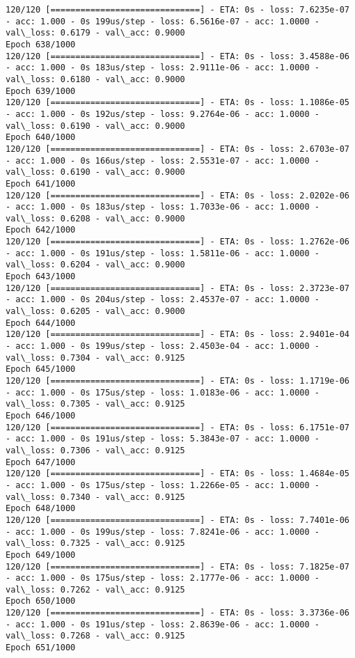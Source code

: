 \documentclass[11pt]{article}
\begin{document}
\begin{Verbatim}[commandchars=\\\{\}]
120/120 [==============================] - ETA: 0s - loss: 7.6235e-07 - acc: 1.000 - 0s 199us/step - loss: 6.5616e-07 - acc: 1.0000 - val\_loss: 0.6179 - val\_acc: 0.9000
Epoch 638/1000
120/120 [==============================] - ETA: 0s - loss: 3.4588e-06 - acc: 1.000 - 0s 183us/step - loss: 2.9111e-06 - acc: 1.0000 - val\_loss: 0.6180 - val\_acc: 0.9000
Epoch 639/1000
120/120 [==============================] - ETA: 0s - loss: 1.1086e-05 - acc: 1.000 - 0s 192us/step - loss: 9.2764e-06 - acc: 1.0000 - val\_loss: 0.6190 - val\_acc: 0.9000
Epoch 640/1000
120/120 [==============================] - ETA: 0s - loss: 2.6703e-07 - acc: 1.000 - 0s 166us/step - loss: 2.5531e-07 - acc: 1.0000 - val\_loss: 0.6190 - val\_acc: 0.9000
Epoch 641/1000
120/120 [==============================] - ETA: 0s - loss: 2.0202e-06 - acc: 1.000 - 0s 183us/step - loss: 1.7033e-06 - acc: 1.0000 - val\_loss: 0.6208 - val\_acc: 0.9000
Epoch 642/1000
120/120 [==============================] - ETA: 0s - loss: 1.2762e-06 - acc: 1.000 - 0s 191us/step - loss: 1.5811e-06 - acc: 1.0000 - val\_loss: 0.6204 - val\_acc: 0.9000
Epoch 643/1000
120/120 [==============================] - ETA: 0s - loss: 2.3723e-07 - acc: 1.000 - 0s 204us/step - loss: 2.4537e-07 - acc: 1.0000 - val\_loss: 0.6205 - val\_acc: 0.9000
Epoch 644/1000
120/120 [==============================] - ETA: 0s - loss: 2.9401e-04 - acc: 1.000 - 0s 199us/step - loss: 2.4503e-04 - acc: 1.0000 - val\_loss: 0.7304 - val\_acc: 0.9125
Epoch 645/1000
120/120 [==============================] - ETA: 0s - loss: 1.1719e-06 - acc: 1.000 - 0s 175us/step - loss: 1.0183e-06 - acc: 1.0000 - val\_loss: 0.7305 - val\_acc: 0.9125
Epoch 646/1000
120/120 [==============================] - ETA: 0s - loss: 6.1751e-07 - acc: 1.000 - 0s 191us/step - loss: 5.3843e-07 - acc: 1.0000 - val\_loss: 0.7306 - val\_acc: 0.9125
Epoch 647/1000
120/120 [==============================] - ETA: 0s - loss: 1.4684e-05 - acc: 1.000 - 0s 175us/step - loss: 1.2266e-05 - acc: 1.0000 - val\_loss: 0.7340 - val\_acc: 0.9125
Epoch 648/1000
120/120 [==============================] - ETA: 0s - loss: 7.7401e-06 - acc: 1.000 - 0s 199us/step - loss: 7.8241e-06 - acc: 1.0000 - val\_loss: 0.7325 - val\_acc: 0.9125
Epoch 649/1000
120/120 [==============================] - ETA: 0s - loss: 7.1825e-07 - acc: 1.000 - 0s 175us/step - loss: 2.1777e-06 - acc: 1.0000 - val\_loss: 0.7262 - val\_acc: 0.9125
Epoch 650/1000
120/120 [==============================] - ETA: 0s - loss: 3.3736e-06 - acc: 1.000 - 0s 191us/step - loss: 2.8639e-06 - acc: 1.0000 - val\_loss: 0.7268 - val\_acc: 0.9125
Epoch 651/1000

\end{Verbatim}
\end{document}
